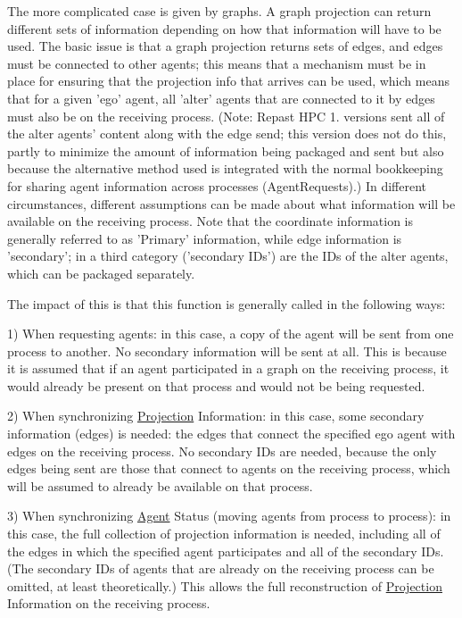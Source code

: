 The more complicated case is given by graphs. A graph projection can return different sets of information depending on how that information will have to be used. The basic issue is that a graph projection returns sets of edges, and edges must be connected to other agents; this means that a mechanism must be in place for ensuring that the projection info that arrives can be used, which means that for a given 'ego' agent, all 'alter' agents that are connected to it by edges must also be on the receiving process. (Note\-: Repast H\-P\-C 1. versions sent all of the alter agents' content along with the edge send; this version does not do this, partly to minimize the amount of information being packaged and sent but also because the alternative method used is integrated with the normal bookkeeping for sharing agent information across processes (Agent\-Requests).) In different circumstances, different assumptions can be made about what information will be available on the receiving process. Note that the coordinate information is generally referred to as 'Primary' information, while edge information is 'secondary'; in a third category ('secondary I\-Ds') are the I\-Ds of the alter agents, which can be packaged separately.

The impact of this is that this function is generally called in the following ways\-:

1) When requesting agents\-: in this case, a copy of the agent will be sent from one process to another. No secondary information will be sent at all. This is because it is assumed that if an agent participated in a graph on the receiving process, it would already be present on that process and would not be being requested.

2) When synchronizing \hyperlink{classrepast_1_1_projection}{Projection} Information\-: in this case, some secondary information (edges) is needed\-: the edges that connect the specified ego agent with edges on the receiving process. No secondary I\-Ds are needed, because the only edges being sent are those that connect to agents on the receiving process, which will be assumed to already be available on that process.

3) When synchronizing \hyperlink{classrepast_1_1_agent}{Agent} Status (moving agents from process to process)\-: in this case, the full collection of projection information is needed, including all of the edges in which the specified agent participates and all of the secondary I\-Ds. (The secondary I\-Ds of agents that are already on the receiving process can be omitted, at least theoretically.) This allows the full reconstruction of \hyperlink{classrepast_1_1_projection}{Projection} Information on the receiving process.


